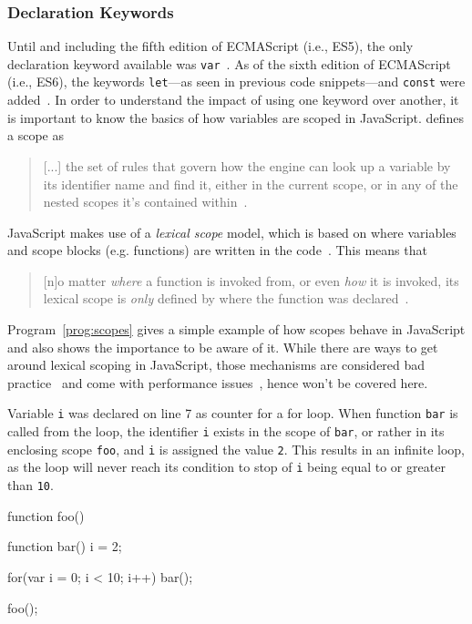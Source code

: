 \label{sec:latest-improvements}

\subsubsection{Declaration Keywords}

Until and including the fifth edition of ECMAScript (i.e., ES5), the only declaration keyword available was \texttt{var}~\cite[p.~87]{ES5Spec:Ecma:2015}. As of the sixth edition of ECMAScript (i.e., ES6), the keywords \texttt{let}---as seen in previous code snippets---and \texttt{const} were added~\cite[p.~194]{ES6Spec:Ecma:2015}. In order to understand the impact of using one keyword over another, it is important to know the basics of how variables are scoped in JavaScript. \citeauthor{YDKJS:ScopesAndClosures:Simpson:2014} defines a scope as 
\begin{quote}
  [...] the set of rules that govern how the engine can look up a variable by its identifier name and find it, either in the current scope, or in any of the nested scopes it’s contained within~\cite[p.~13]{YDKJS:ScopesAndClosures:Simpson:2014}.
\end{quote}
JavaScript makes use of a \emph{lexical scope} model, which is based on where variables and scope blocks (e.g. functions) are written in the code~\cite[p.~13]{YDKJS:ScopesAndClosures:Simpson:2014}. This means that 
\begin{quote}
  [n]o matter \emph{where} a function is invoked from, or even \emph{how} it is invoked, its lexical scope is \emph{only} defined by where the function was declared~\cite[p.~16]{YDKJS:ScopesAndClosures:Simpson:2014}.
\end{quote}
Program~\ref{prog:scopes} gives a simple example of how scopes behave in JavaScript and also shows the importance to be aware of it. While there are ways to get around lexical scoping in JavaScript, those mechanisms are considered bad practice~\cite[p.~14]{YDKJS:ScopesAndClosures:Simpson:2014} and come with performance issues~\cite[p.~21]{YDKJS:ScopesAndClosures:Simpson:2014}, hence won't be covered here.

\begin{program}
\caption{Variable \texttt{i} was declared on line 7 as counter for a for loop. When function \texttt{bar} is called from the loop, the identifier \texttt{i} exists in the scope of \texttt{bar}, or rather in its enclosing scope \texttt{foo}, and \texttt{i} is assigned the value \texttt{2}. This results in an infinite loop, as the loop will never reach its condition to stop of \texttt{i} being equal to or greater than \texttt{10}.~\cite[p.~26]{YDKJS:ScopesAndClosures:Simpson:2014}}
\label{prog:scopes}
\begin{JsCode}
function foo() {

  function bar() {
    i = 2;
  }
  
  for(var i = 0; i < 10; i++) {
    bar();
  }
  
}

foo();
\end{JsCode}
\end{program}

